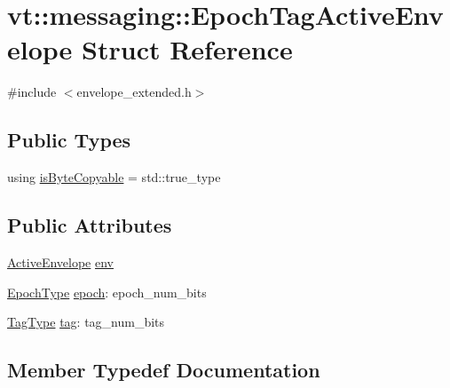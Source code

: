 \hypertarget{structvt_1_1messaging_1_1_epoch_tag_active_envelope}{}\section{vt\+:\+:messaging\+:\+:Epoch\+Tag\+Active\+Envelope Struct Reference}
\label{structvt_1_1messaging_1_1_epoch_tag_active_envelope}


{\ttfamily \#include $<$envelope\+\_\+extended.\+h$>$}

\subsection*{Public Types}
\begin{DoxyCompactItemize}
\item 
using \hyperlink{structvt_1_1messaging_1_1_epoch_tag_active_envelope_ae7178428c476ea23165e0622dcabf681}{is\+Byte\+Copyable} = std\+::true\+\_\+type
\end{DoxyCompactItemize}
\subsection*{Public Attributes}
\begin{DoxyCompactItemize}
\item 
\hyperlink{structvt_1_1messaging_1_1_active_envelope}{Active\+Envelope} \hyperlink{structvt_1_1messaging_1_1_epoch_tag_active_envelope_a9d1a68dc7a32fd13be13155794c03029}{env}
\item 
\hyperlink{namespacevt_a985a5adf291c34a3ca263b3378388236}{Epoch\+Type} \hyperlink{structvt_1_1messaging_1_1_epoch_tag_active_envelope_aaccd25acb58b516788297503ea8ea67e}{epoch}\+: epoch\+\_\+num\+\_\+bits
\item 
\hyperlink{namespacevt_a84ab281dae04a52a4b243d6bf62d0e52}{Tag\+Type} \hyperlink{structvt_1_1messaging_1_1_epoch_tag_active_envelope_aafb75781896b2eebe8cf1feae02c46f5}{tag}\+: tag\+\_\+num\+\_\+bits
\end{DoxyCompactItemize}


\subsection{Member Typedef Documentation}
\mbox{\label{structvt_1_1messaging_1_1_epoch_tag_active_envelope_ae7178428c476ea23165e0622dcabf681}} 
